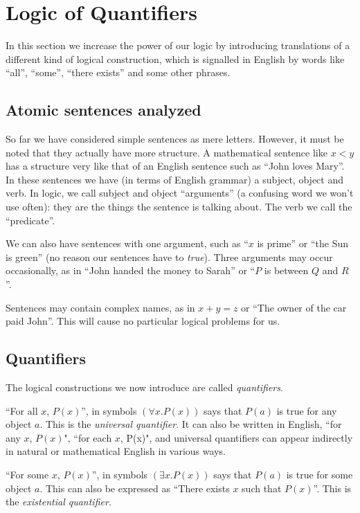 \documentclass[12pt]{article}
\begin{document}
\section{Logic of Quantifiers}

In this section we increase the power of our logic by introducing
translations of a different kind of logical construction, which is
signalled in English by words like ``all'', ``some'', ``there exists''
and some other phrases.

\subsection{Atomic sentences analyzed}

So far we have considered simple sentences as mere letters.  However,
it must be noted that they actually have more structure.  A
mathematical sentence like $x < y$ has a structure very like that of
an English sentence such as ``John loves Mary''.  In these sentences
we have (in terms of English grammar) a subject, object and verb.  In
logic, we call subject and object ``arguments'' (a confusing word we
won't use often): they are the things the sentence is talking about.
The verb we call the ``predicate''.

We can also have sentences with one argument, such as ``$x$ is prime''
or ``the Sun is green'' (no reason our sentences have to {\em
true\/}).  Three arguments may occur occasionally, as in ``John handed
the money to Sarah'' or ``$P$ is between $Q$ and $R$''.

Sentences may contain complex names, as in $x+y=z$ or ``The owner of
the car paid John''.  This will cause no particular logical problems
for us.

\subsection{Quantifiers}

The logical constructions we now introduce are called {\em quantifiers\/}.

``For all $x$, $P(x)$'', in symbols $(\forall x.P(x))$ says that
$P(a)$ is true for any object $a$.  This is the {\em universal quantifier\/}.
It can also be written in English, ``for any $x$, $P(x)$", ``for each $x$, P(x)",
and universal quantifiers can appear indirectly in natural or mathematical English in various ways.

``For some $x$, $P(x)$'', in symbols $(\exists x.P(x))$ says that
$P(a)$ is true for some object $a$.  This can also be expressed as
``There exists $x$ such that $P(x)$''.  This is the {\em existential
quantifier\/}.
\end{document}
